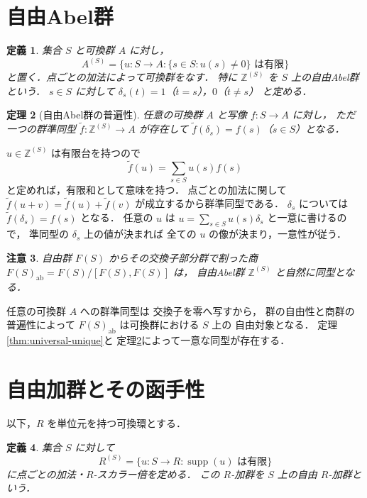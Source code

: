 \documentclass[a5paper,10pt,onecolumn]{jsarticle}
\makeatletter
\theoremstyle{mathnotetheorem}
\newtheorem{theorem}{定理}[section]
\newtheorem{definition}[theorem]{定義}
\newtheorem{remark}[theorem]{注意}
\renewcommand{\proofname}{証明}
\renewenvironment{proof}[1][\proofname]{%
  \par\pushQED{\qed}\normalfont\topsep4\p@\@plus2\p@\relax
  \trivlist\item[\hskip\labelsep\bfseries #1]\ignorespaces
}{\popQED\endtrivlist\@endpefalse}
\makeatother
\begin{document}
\section{自由Abel群}

\begin{definition}
集合 $S$ と可換群 $A$ に対し，
\[
 A^{(S)}
 =\{u:S\to A:\{s\in S:u(s)\ne0\}\text{ は有限}\}
\]
と置く．点ごとの加法によって可換群をなす．
特に $\mathbb Z^{(S)}$ を $S$ 上の自由Abel群という．
$s\in S$ に対して
$\delta_s(t)=1$（$t=s$），$0$（$t\ne s$）
と定める．
\end{definition}

\begin{theorem}[自由Abel群の普遍性]\label{thm:free-abelian}
任意の可換群 $A$ と写像 $f:S\to A$ に対し，
ただ一つの群準同型
$\widetilde f:\mathbb Z^{(S)}\to A$ が存在して
$\widetilde f(\delta_s)=f(s)$（$s\in S$）となる．
\end{theorem}
\begin{proof}
$u\in\mathbb Z^{(S)}$ は有限台を持つので
\[
 \widetilde f(u)=\sum_{s\in S}u(s)f(s)
\]
と定めれば，有限和として意味を持つ．
点ごとの加法に関して
$\widetilde f(u+v)=\widetilde f(u)+\widetilde f(v)$
が成立するから群準同型である．
$\delta_s$ については
$\widetilde f(\delta_s)=f(s)$ となる．
任意の $u$ は
$u=\sum_{s\in S}u(s)\delta_s$ と一意に書けるので，
準同型の $\delta_s$ 上の値が決まれば
全ての $u$ の像が決まり，一意性が従う．
\end{proof}

\begin{remark}
自由群 $F(S)$ からその交換子部分群で割った商
$F(S)_{\mathrm{ab}}=F(S)/[F(S),F(S)]$ は，
自由Abel群 $\mathbb Z^{(S)}$ と自然に同型となる．
\end{remark}
\begin{proof}
任意の可換群 $A$ への群準同型は
交換子を零へ写すから，
群の自由性と商群の普遍性によって
$F(S)_{\mathrm{ab}}$ は可換群における $S$ 上の
自由対象となる．
定理\ref{thm:universal-unique}と
定理\ref{thm:free-abelian}によって一意な同型が存在する．
\end{proof}

\section{自由加群とその函手性}

以下，$R$ を単位元を持つ可換環とする．

\begin{definition}
集合 $S$ に対して
\[
 R^{(S)}=\{u:S\to R:\operatorname{supp}(u)\text{ は有限}\}
\]
に点ごとの加法・$R$-スカラー倍を定める．
この $R$-加群を $S$ 上の自由 $R$-加群という．
\end{definition}
\end{document}
